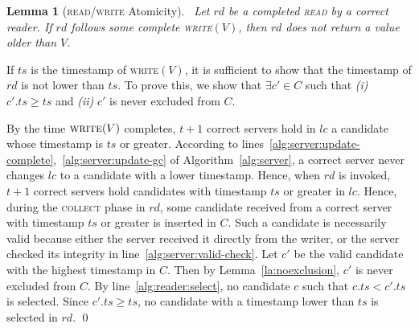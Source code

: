 \documentclass[10pt,conference,compsocconf]{IEEEtran}
\newtheorem{la}[defn]{Lemma}
\newenvironment{prooff}{\vspace{1ex}\noindent{\bf Proof:}\hspace{0.5em}}
	{\hfill\qed\vspace{1em}}
\begin{document}
\begin{la}[\textsc{read}/\textsc{write} Atomicity]~\label{la:rwatomic}
Let $rd$ be a completed \textsc{read} by a correct reader. If $rd$ follows some complete \textsc{write}$(V)$, then $rd$ does not return a value older than $V$.
\end{la}
\begin{prooff}
If $ts$ is the timestamp of \textsc{write}$(V)$, it is sufficient to show that the timestamp of $rd$ is not lower than $ts$. To prove this, we show that $\exists c' \in C$ such that \emph{(i)} $c'.ts \geq ts$ and \emph{(ii)} $c'$ is never excluded from $C$.

By the time $\textsc{write}(V)$ completes, $t+1$ correct servers hold in $lc$ a candidate whose timestamp is $ts$ or greater. According to lines~\ref{alg:server:update-complete},~\ref{alg:server:update-gc} of Algorithm~\ref{alg:server}, a correct server never changes $lc$ to a candidate with a lower timestamp. Hence, when $rd$ is invoked, $t+1$ correct servers hold candidates with timestamp $ts$ or greater in $lc$. Hence, during the \textsc{collect} phase in $rd$, some candidate received from a correct server with timestamp $ts$ or greater is inserted in $C$. Such a candidate is necessarily valid because either the server received it directly from the writer, or the server checked its integrity in line~\ref{alg:server:valid-check}. Let $c'$ be the valid candidate with the highest timestamp in $C$. Then by Lemma~\ref{la:noexclusion}, $c'$ is never excluded from $C$. By line~\ref{alg:reader:select}, no candidate $c$ such that $c.ts < c'.ts$ is selected. Since $c'.ts \geq ts$, no candidate with a timestamp lower than $ts$ is selected in $rd$.
\end{prooff}
\end{document}
